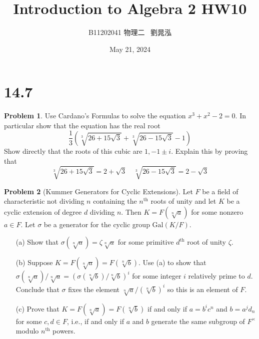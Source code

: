 \documentclass{article}
\title{Introduction to Algebra 2 HW10}
\author{B11202041 物理二 \, 劉晁泓}
\date{May 21, 2024}
\theoremstyle{definition}
\newtheorem{prob}{Problem}
\newcommand{\Gal}{\text{Gal}}
\begin{document}
\maketitle
\thispagestyle{fancy}
\renewcommand{\footrulewidth}{0.4pt}
\cfoot{\thepage}
\renewcommand{\headrulewidth}{0.4pt}

\section*{14.7}

\setcounter{prob}{0}
\begin{prob}
	Use Cardano's Formulas to solve the equation $x^3 + x^2 - 2 = 0$.
	In particular show that the equation has the real root
	\[
		\frac{1}{3} \left( \sqrt[3]{26 + 15 \sqrt{3}} + \sqrt[3]{26 - 15 \sqrt{3}} - 1 \right)
	\]
	Show directly that the roots of this cubic are $1, -1 \pm i$.
	Explain this by proving that 
	\[
		\sqrt[3]{26 + 15 \sqrt{3}} = 2 + \sqrt{3} \quad \sqrt[3]{26 - 15 \sqrt{3}} = 2 - \sqrt{3}
	\]
\end{prob}

\setcounter{prob}{6}
\begin{prob}[Kummer Generators for Cyclic Extensions]
	Let $F$ be a field of characteristic not dividing $n$ containing the $n^{\text{th}}$ roots of unity and let $K$ be a cyclic extension of degree $d$ dividing $n$.
	Then $K = F(\sqrt[n]{a})$ for some nonzero $a \in F$.
	Let $\sigma$ be a generator for the cyclic group $\Gal(K/F)$.

	\begin{enumerate}
		\item[(a)] Show that $\sigma(\sqrt[n]{a}) = \zeta \sqrt[n]{a}$ for some primitive $d^{\text{th}}$ root of unity $\zeta$.

		\item[(b)] Suppose $K = F(\sqrt[n]{a}) = F(\sqrt[n]{b})$.
			Use (a) to show that $\sigma(\sqrt[n]{a})/\sqrt[n]{a} = (\sigma(\sqrt[n]{b})/\sqrt[n]{b})^i$ for some integer $i$ relatively prime to $d$.
			Conclude that $\sigma$ fixes the element $\sqrt[n]{a}/(\sqrt[n]{b})^i$ so this is an element of $F$.

		\item[(c)] Prove that $K = F(\sqrt[n]{a}) = F(\sqrt[n]{b})$ if and only if $a = b^i c^n$ and $b = a^j d_n$ for some $c, d \in F$, i.e., if and only if $a$ and $b$ generate the same subgroup of $F^\times$ modulo $n^{\text{th}}$ powers.
	\end{enumerate}
\end{prob}
\end{document}

